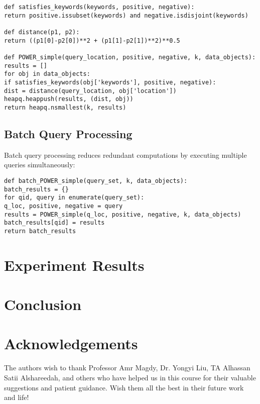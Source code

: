 \documentclass[]{IEEEphot}
\begin{document}
\begin{verbatim}
def satisfies_keywords(keywords, positive, negative):
return positive.issubset(keywords) and negative.isdisjoint(keywords)

def distance(p1, p2):
return ((p1[0]-p2[0])**2 + (p1[1]-p2[1])**2)**0.5

def POWER_simple(query_location, positive, negative, k, data_objects):
results = []
for obj in data_objects:
if satisfies_keywords(obj['keywords'], positive, negative):
dist = distance(query_location, obj['location'])
heapq.heappush(results, (dist, obj))
return heapq.nsmallest(k, results)
\end{verbatim}

\subsection{Batch Query Processing}
Batch query processing reduces redundant computations by executing multiple queries simultaneously:

\begin{verbatim}
def batch_POWER_simple(query_set, k, data_objects):
batch_results = {}
for qid, query in enumerate(query_set):
q_loc, positive, negative = query
results = POWER_simple(q_loc, positive, negative, k, data_objects)
batch_results[qid] = results
return batch_results
\end{verbatim}


\section{Experiment Results}









\section{Conclusion}









\newpage

\section*{Acknowledgements}
The authors wish to thank Professor Amr Magdy, Dr. Yongyi Liu, TA Alhassan Satii Alshareedah, and others who have helped us in this course for their valuable suggestions and patient guidance. Wish them all the best in their future work and life!
\end{document}
